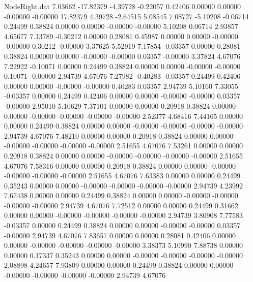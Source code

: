 \begin{filecontents}{NodeRight.dat}
   7.03662  -17.82379   -4.39728    -0.22057    0.42406    0.00000    0.00000   -0.00000   -0.00000   17.82379    4.39728   -2.64515    5.08545
   7.08727   -5.10208   -0.06714     0.24499    0.38824    0.00000    0.00000   -0.00000   -0.00000    5.10208    0.06714    2.93857    4.65677
   7.13789   -0.30212    0.00000     0.28081    0.45987    0.00000    0.00000   -0.00000   -0.00000    0.30212   -0.00000    3.37625    5.52919
   7.17854   -0.03357    0.00000     0.28081    0.38824    0.00000    0.00000   -0.00000   -0.00000    0.03357   -0.00000    3.37824    4.67076
   7.22922   -0.10071    0.00000     0.24499    0.38824    0.00000    0.00000   -0.00000   -0.00000    0.10071   -0.00000    2.94739    4.67076
   7.27982   -0.40283   -0.03357     0.24499    0.42406    0.00000    0.00000   -0.00000   -0.00000    0.40283    0.03357    2.94739    5.10160
   7.33055   -0.03357    0.00000     0.24499    0.42406    0.00000    0.00000   -0.00000   -0.00000    0.03357   -0.00000    2.95010    5.10629
   7.37101    0.00000    0.00000     0.20918    0.38824    0.00000    0.00000   -0.00000   -0.00000   -0.00000   -0.00000    2.52377    4.68416
   7.44165    0.00000    0.00000     0.24499    0.38824    0.00000    0.00000   -0.00000   -0.00000   -0.00000   -0.00000    2.94739    4.67076
   7.48210    0.00000    0.00000     0.20918    0.38824    0.00000    0.00000   -0.00000   -0.00000   -0.00000   -0.00000    2.51655    4.67076
   7.53261    0.00000    0.00000     0.20918    0.38824    0.00000    0.00000   -0.00000   -0.00000   -0.00000   -0.00000    2.51655    4.67076
   7.58316    0.00000    0.00000     0.20918    0.38824    0.00000    0.00000   -0.00000   -0.00000   -0.00000   -0.00000    2.51655    4.67076
   7.63383    0.00000    0.00000     0.24499    0.35243    0.00000    0.00000   -0.00000   -0.00000   -0.00000   -0.00000    2.94739    4.23992
   7.67438    0.00000    0.00000     0.24499    0.38824    0.00000    0.00000   -0.00000   -0.00000   -0.00000   -0.00000    2.94739    4.67076
   7.72512    0.00000    0.00000     0.24499    0.31662    0.00000    0.00000   -0.00000   -0.00000   -0.00000   -0.00000    2.94739    3.80908
   7.77583   -0.03357    0.00000     0.24499    0.38824    0.00000    0.00000   -0.00000   -0.00000    0.03357   -0.00000    2.94739    4.67076
   7.83657    0.00000    0.00000     0.28081    0.42406    0.00000    0.00000   -0.00000   -0.00000   -0.00000   -0.00000    3.38373    5.10990
   7.88738    0.00000    0.00000     0.17337    0.35243    0.00000    0.00000   -0.00000   -0.00000   -0.00000   -0.00000    2.08898    4.24657
   7.93809    0.00000    0.00000     0.24499    0.38824    0.00000    0.00000   -0.00000   -0.00000   -0.00000   -0.00000    2.94739    4.67076

\end{filecontents}
